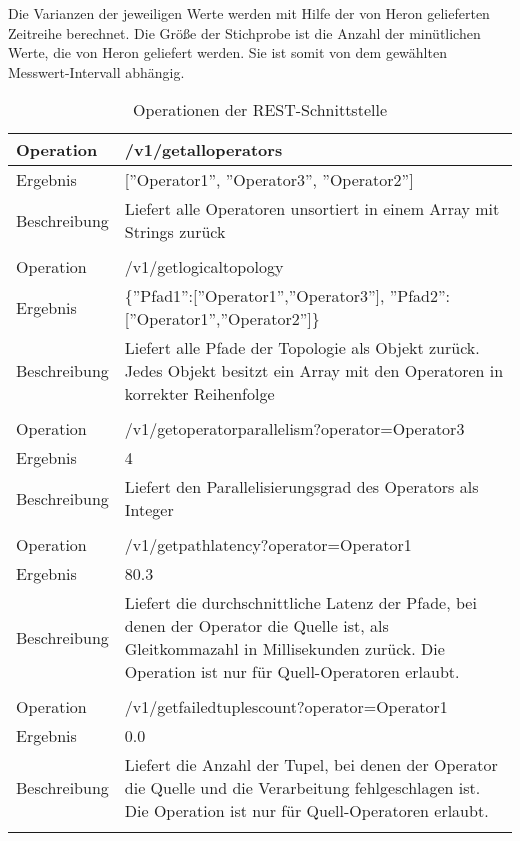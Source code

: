 Die Varianzen der jeweiligen Werte werden mit Hilfe der von Heron gelieferten Zeitreihe berechnet.
Die Größe der Stichprobe ist die Anzahl der minütlichen Werte, die von Heron geliefert werden.
Sie ist somit von dem gewählten Messwert-Intervall abhängig.

\begin{longtable}{|p{2cm}|p{12cm}|}

\caption{Operationen der REST-Schnittstelle}
\endfirsthead
\caption{Operationen der REST-Schnittstelle}
\endhead
\endfoot
\endlastfoot

\hline
Operation & /v1/getalloperators \\ \hline
Ergebnis & {[}''Operator1'', ''Operator3'', ''Operator2''{]} \\ \hline
Beschreibung & Liefert alle Operatoren unsortiert in einem Array mit Strings zurück \\ \hline
\multicolumn{2}{|l|}{} \\ \hline

Operation & /v1/getlogicaltopology \\ \hline
Ergebnis & \{''Pfad1'':{[}''Operator1'',''Operator3''{]}, ''Pfad2'':{[}''Operator1'',''Operator2''{]}\} \\ \hline
Beschreibung & Liefert alle Pfade der Topologie als Objekt zurück. Jedes Objekt besitzt ein Array mit den Operatoren in korrekter Reihenfolge \\ \hline
\multicolumn{2}{|l|}{} \\ \hline

Operation & /v1/getoperatorparallelism?operator=Operator3 \\ \hline
Ergebnis & 4 \\ \hline
Beschreibung & Liefert den Parallelisierungsgrad des Operators als Integer \\ \hline
\multicolumn{2}{|l|}{} \\ \hline

Operation & /v1/getpathlatency?operator=Operator1 \\ \hline
Ergebnis & 80.3 \\ \hline
Beschreibung & Liefert die durchschnittliche Latenz der Pfade, bei denen der Operator die Quelle ist, als Gleitkommazahl in Millisekunden zurück. Die Operation ist nur für Quell-Operatoren erlaubt.  \\ \hline
\multicolumn{2}{|l|}{} \\ \hline

Operation & /v1/getfailedtuplescount?operator=Operator1 \\ \hline
Ergebnis & 0.0 \\ \hline
Beschreibung & Liefert die Anzahl der Tupel, bei denen der Operator die Quelle und die Verarbeitung fehlgeschlagen ist. Die Operation ist nur für Quell-Operatoren erlaubt.  \\ \hline
\multicolumn{2}{|l|}{} \\ \hline


\end{longtable}
